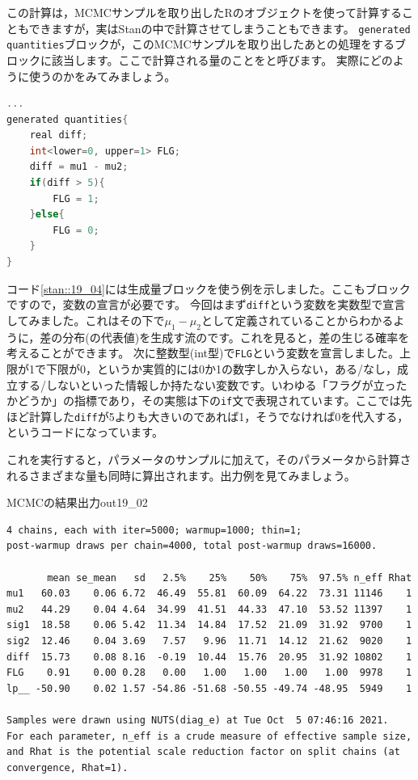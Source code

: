 \documentclass{ltjsbook}
\begin{document}
この計算は，MCMCサンプルを取り出したRのオブジェクトを使って計算することもできますが，実はStanの中で計算させてしまうこともできます。
\texttt{generated quantities}ブロックが，このMCMCサンプルを取り出したあとの処理をするブロックに該当します。ここで計算される量のことをと呼びます。
実際にどのように使うのかをみてみましょう。

\begin{lstlisting}[language=C++,label={stan::19_04},caption={生成量ブロックの利用}]
    ...
generated quantities{
    real diff;
    int<lower=0, upper=1> FLG;
    diff = mu1 - mu2;
    if(diff > 5){
        FLG = 1;
    }else{
        FLG = 0;
    }
}

\end{lstlisting}

コード\ref{stan::19_04}には生成量ブロックを使う例を示しました。ここもブロックですので，変数の宣言が必要です。
今回はまず\verb|diff|という変数を実数型で宣言してみました。これはその下で$\mu_1-\mu_2$として定義されていることからわかるように，差の分布(の代表値)を生成す流のです。これを見ると，差の生じる確率を考えることができます。
次に整数型(int型)で\verb|FLG|という変数を宣言しました。上限が1で下限が0，というか実質的には0か1の数字しか入らない，ある/なし，成立する/しないといった情報しか持たない変数です。いわゆる「フラグが立ったかどうか」の指標であり，その実態は下の\texttt{if}文で表現されています。ここでは先ほど計算した\verb|diff|が5よりも大きいのであれば1，そうでなければ0を代入する，というコードになっています。

これを実行すると，パラメータのサンプルに加えて，そのパラメータから計算されるさまざまな量も同時に算出されます。出力例を見てみましょう。
\begin{SCrstan}{MCMCの結果出力}{out19_02}
    \begin{verbatim}
4 chains, each with iter=5000; warmup=1000; thin=1; 
post-warmup draws per chain=4000, total post-warmup draws=16000.

       mean se_mean   sd   2.5%    25%    50%    75%  97.5% n_eff Rhat
mu1   60.03    0.06 6.72  46.49  55.81  60.09  64.22  73.31 11146    1
mu2   44.29    0.04 4.64  34.99  41.51  44.33  47.10  53.52 11397    1
sig1  18.58    0.06 5.42  11.34  14.84  17.52  21.09  31.92  9700    1
sig2  12.46    0.04 3.69   7.57   9.96  11.71  14.12  21.62  9020    1
diff  15.73    0.08 8.16  -0.19  10.44  15.76  20.95  31.92 10802    1
FLG    0.91    0.00 0.28   0.00   1.00   1.00   1.00   1.00  9978    1
lp__ -50.90    0.02 1.57 -54.86 -51.68 -50.55 -49.74 -48.95  5949    1

Samples were drawn using NUTS(diag_e) at Tue Oct  5 07:46:16 2021.
For each parameter, n_eff is a crude measure of effective sample size,
and Rhat is the potential scale reduction factor on split chains (at 
convergence, Rhat=1). 
   \end{verbatim}
\end{SCrstan}
\end{document}
